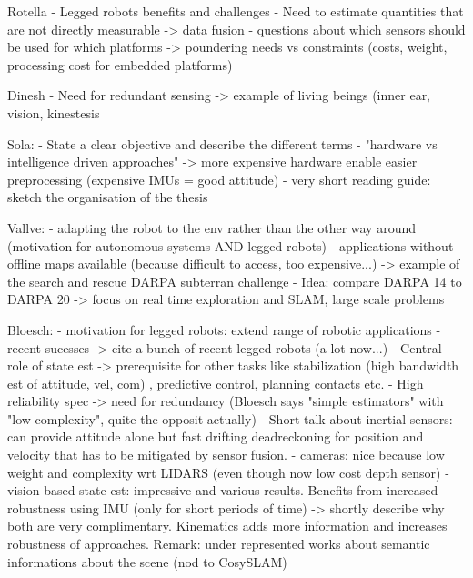
Rotella 
- Legged robots benefits and challenges
- Need to estimate quantities that are not directly measurable -> data fusion
- questions about which sensors should be used for which platforms 
    -> poundering needs vs constraints (costs, weight, processing cost for embedded platforms)

Dinesh
- Need for redundant sensing -> example of living beings (inner ear, vision, kinestesis

Sola:
- State a clear objective and describe the different terms
- "hardware vs intelligence driven approaches" 
    -> more expensive hardware enable easier preprocessing (expensive IMUs = good attitude)
- very short reading guide: sketch the organisation of the thesis

Vallve:
- adapting the robot to the env rather than the other way around (motivation for autonomous systems AND legged robots)
- applications without offline maps available (because difficult to access, too expensive...) 
    -> example of the search and rescue DARPA subterran challenge
- Idea: compare DARPA 14 to DARPA 20 -> focus on real time exploration and SLAM, large scale problems

Bloesch:
- motivation for legged robots: extend range of robotic applications
- recent sucesses -> cite a bunch of recent legged robots (a lot now...)
- Central role of state est -> prerequisite for other tasks like stabilization (high bandwidth est of attitude, vel, com)
, predictive control, planning contacts etc.
- High reliability spec -> need for redundancy (Bloesch says "simple estimators" with "low complexity", quite the opposit actually)
- Short talk about inertial sensors: can provide attitude alone but fast drifting deadreckoning for position and velocity that has to be mitigated by sensor fusion.
- cameras: nice because low weight and complexity wrt LIDARS (even though now low cost depth sensor)
- vision based state est: impressive and various results. Benefits from increased robustness using IMU (only for short periods of time)
    -> shortly describe why both are very complimentary. Kinematics adds more information and increases robustness of approaches.
Remark: under represented works about semantic informations about the scene (nod to CosySLAM)

